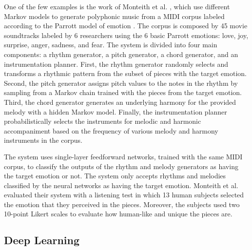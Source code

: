 One of the few examples is the work of Monteith et al. \cite{monteith2010automatic, chan2008automatic}, which use different Markov models to generate polyphonic music from a MIDI corpus labeled according to the Parrott model of emotion \cite{parrott2001emotions}. The corpus is composed by 45 movie soundtracks labeled by 6 researchers using the 6 basic Parrott emotions: love, joy, surprise, anger, sadness, and fear. The system is divided into four main components: a rhythm generator, a pitch generator, a chord generator, and an instrumentation planner.
First, the rhythm generator randomly selects and transforms a rhythmic pattern from the subset of pieces with the target emotion. Second, the pitch generator assigns pitch values to the notes in the rhythm by sampling from a Markov chain trained with the pieces from the target emotion. Third, the chord generator generates an underlying harmony for the provided melody with a hidden Markov model. Finally, the instrumentation planner probabilistically selects the instruments for melodic and harmonic accompaniment based on the frequency of various melody and harmony instruments in the corpus.

The system uses single-layer feedforward networks, trained with the same MIDI corpus, to classify the outputs of the rhythm and melody generators as having the target emotion or not. The system only accepts rhythms and melodies classified by the neural networks as having the target emotion. Monteith et al. \cite{monteith2010automatic} evaluated their system with a listening test in which 13 human subjects selected the emotion that they perceived in the pieces. Moreover, the subjects used two 10-point Likert scales to evaluate how human-like and unique the pieces are.


\subsection{Deep Learning}


